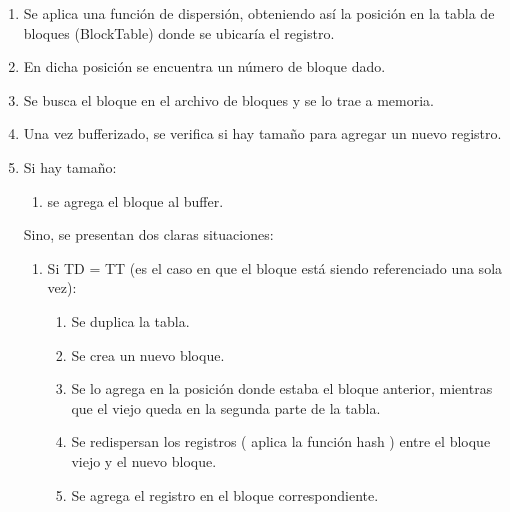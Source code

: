 \documentclass{article}
\begin{document}
	{\ttfamily\footnotesize
	\begin{enumerate}
	\itemsep=5pt \topsep=0pt \partopsep=0pt \parskip=0pt \parsep=0pt

		\item Se aplica una función de dispersión, obteniendo así la posición en la tabla de bloques (BlockTable) donde se ubicaría el registro.

		\item En dicha posición se encuentra un número de bloque dado. 

		\item Se busca el bloque en el archivo de bloques y se lo trae a memoria.

		\item Una vez bufferizado, se verifica si hay tamaño para agregar un nuevo registro. 

		\item Si hay tamaño:
			\begin{enumerate}
			\itemsep=5pt \topsep=0pt \partopsep=0pt \parskip=0pt \parsep=0pt

				\item se agrega el bloque al buffer. 

			\end{enumerate}

			Sino, se presentan dos claras situaciones:

			\begin{enumerate}
			\itemsep=5pt \topsep=0pt \partopsep=0pt \parskip=0pt \parsep=0pt

				\item Si TD = TT (es el caso en que el bloque está siendo referenciado una sola vez):
					
					\begin{enumerate}
					\itemsep=5pt \topsep=0pt \partopsep=0pt \parskip=0pt \parsep=0pt

						\item Se duplica la tabla.
						\item Se crea un nuevo bloque.
						\item Se lo agrega en la posición donde estaba el bloque anterior, mientras que el viejo queda en la segunda parte de la tabla.
						\item Se redispersan los registros ( aplica la función hash ) entre el bloque viejo y el nuevo bloque.
						\item Se agrega el registro en el bloque correspondiente.

					\end{enumerate}


\end{enumerate}
\end{enumerate}}
\end{document}
